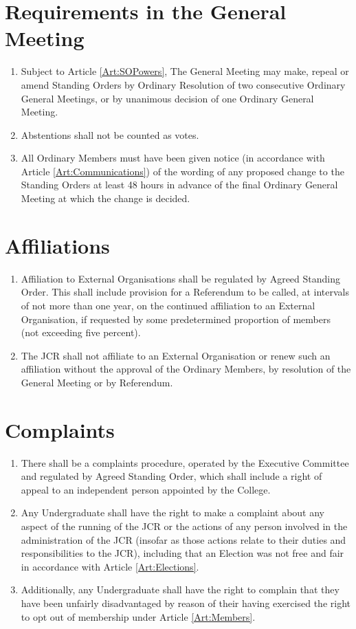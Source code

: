 \documentclass[11pt,a4paper, oneside]{memoir}
\begin{document}
	\section{Requirements in the General Meeting}
	\begin{enumerate} \label{Art:SORequirements}
		\item Subject to Article \ref{Art:SOPowers}, The General Meeting may make, repeal or amend Standing Orders by Ordinary Resolution of two consecutive Ordinary General Meetings, or by unanimous decision of one Ordinary General Meeting. 
		\item Abstentions shall not be counted as votes.
		\item All Ordinary Members must have been given notice (in accordance with Article \ref{Art:Communications}) of the wording of any proposed change to the Standing Orders at least 48 hours in advance of the final Ordinary General Meeting at which the change is decided.
	\end{enumerate}
	\section{Affiliations} \label{Art:Affiliations}
	\begin{enumerate}
		\item Affiliation to External Organisations shall be regulated by Agreed Standing Order.  This shall include provision for a Referendum to be called, at intervals of not more than one year, on the continued affiliation to an External Organisation, if requested by some predetermined proportion of members (not exceeding five percent).
		\item The JCR shall not affiliate to an External Organisation or renew such an affiliation without the approval of the Ordinary Members, by resolution of the General Meeting or by Referendum.
	\end{enumerate}
	\section{Complaints}
	\label{Art:Complaints}
	\begin{enumerate}
		\item There shall be a complaints procedure, operated by the Executive Committee and regulated by Agreed Standing Order, which shall include a right of appeal to an independent person appointed by the College.
		\item Any Undergraduate shall have the right to make a complaint about any aspect of the running of the JCR or the actions of any person involved in the administration of the JCR (insofar as those actions relate to their duties and responsibilities to the JCR), including that an Election was not free and fair in accordance with Article \ref{Art:Elections}.
		\item Additionally, any Undergraduate shall have the right to complain that they have been unfairly disadvantaged by reason of their having exercised the right to opt out of membership under Article \ref{Art:Members}.
	\end{enumerate}
\end{document}
